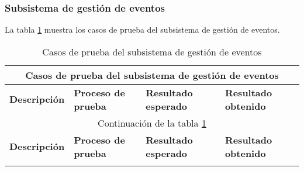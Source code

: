 \begin{landscape}
	 \subsubsection{Subsistema de gestión de eventos}
	 	La tabla \ref{table:casos_prueba_eventos} muestra los casos de prueba del subsistema de gestión de eventos.
	 	
	 	\begin{longtable}[c]{|p{50mm}|p{50mm}|p{50mm}|p{50mm}|}
	 	 \caption{Casos de prueba del subsistema de gestión de eventos\label{table:casos_prueba_eventos}}\\
	 	
	 	 \hline
	 	 \multicolumn{4}{|c|}{\textbf{Casos de prueba del subsistema de gestión de eventos}}\\
	 	 \hline
	 	 \textbf{Descripción} & \textbf{Proceso de prueba} & \textbf{Resultado esperado} & \textbf{Resultado obtenido}\\
	 	 \hline
	 	 \hline
	 	 \endfirsthead
	 	 
	 	 \hline
	 	 \multicolumn{4}{|c|}{Continuación de la tabla \ref{table:casos_prueba_eventos}}\\
	 	 \hline
	 	 \textbf{Descripción} & \textbf{Proceso de prueba} & \textbf{Resultado esperado} & \textbf{Resultado obtenido}\\
	 	 \hline
	 	 \hline
	 	 \endhead
	 	 
	 	 \hline
	 	 \endfoot
	 	 

\end{longtable}
\end{landscape}
